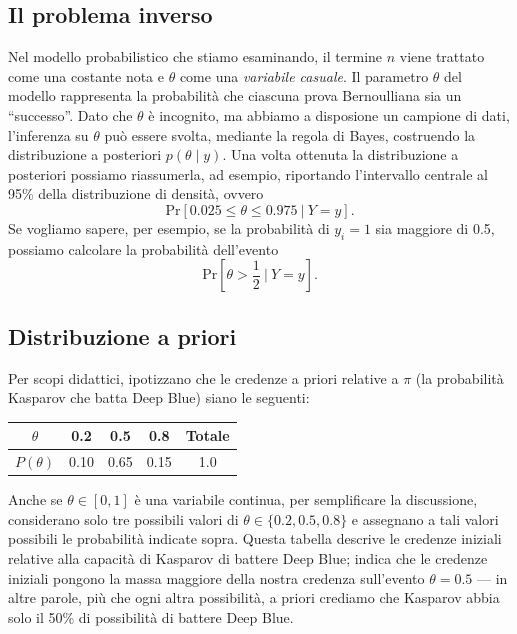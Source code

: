 \documentclass[
  10pt,
  italian,
  a4paper,
  extrafontsizes,onecolumn,openright
  ]{memoir}
\begin{document}
\hypertarget{il-problema-inverso}{%
\subsection{Il problema inverso}\label{il-problema-inverso}}

Nel modello probabilistico che stiamo esaminando, il termine \(n\) viene trattato come una costante nota e \(\theta\) come una \emph{variabile casuale}. Il parametro \(\theta\) del modello rappresenta la probabilità che ciascuna prova Bernoulliana sia un ``successo''. Dato che \(\theta\) è incognito, ma abbiamo a disposione un campione di dati, l'inferenza su \(\theta\) può essere svolta, mediante la regola di Bayes, costruendo la distribuzione a posteriori \(p(\theta \mid y)\). Una volta ottenuta la distribuzione a posteriori possiamo riassumerla, ad esempio, riportando l'intervallo centrale al 95\% della distribuzione di densità, ovvero
\[
\mbox{Pr}\left[ 0.025 \leq \theta \leq 0.975
                \ \Big| \
        Y = y
         \right].
\]
Se vogliamo sapere, per esempio, se la probabilità di \(y_i=1\) sia maggiore di 0.5, possiamo calcolare la probabilità dell'evento
\[
\mbox{Pr}\left[\theta > \frac{1}{2}
                \ \Bigg| \
        Y = y
         \right].
\]

\hypertarget{distribuzione-a-priori}{%
\subsection{Distribuzione a priori}\label{distribuzione-a-priori}}

Per scopi didattici, \textcite{Johnson2022bayesrules} ipotizzano che le credenze a priori relative a \(\pi\) (la probabilità Kasparov che batta Deep Blue) siano le seguenti:

\begin{longtable}[]{@{}ccccc@{}}
\toprule
\(\theta\) & 0.2 & 0.5 & 0.8 & Totale \\
\midrule
\endhead
\(P(\theta)\) & 0.10 & 0.65 & 0.15 & 1.0 \\
\bottomrule
\end{longtable}

Anche se \(\theta \in [0, 1]\) è una variabile continua, per semplificare la discussione, \textcite{Johnson2022bayesrules} considerano solo tre possibili valori di \(\theta \in \{0.2, 0.5, 0.8\}\) e assegnano a tali valori possibili le probabilità indicate sopra. Questa tabella descrive le credenze iniziali relative alla capacità di Kasparov di battere Deep Blue; indica che le credenze iniziali pongono la massa maggiore della nostra credenza sull'evento \(\theta = 0.5\) --- in altre parole, più che ogni altra possibilità, a priori crediamo che Kasparov abbia solo il 50\% di possibilità di battere Deep Blue.
\end{document}
